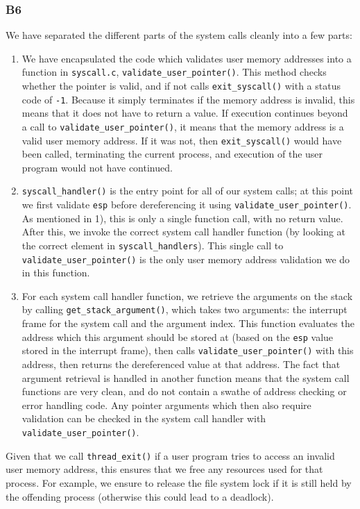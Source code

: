 \documentclass[a4wide, 11pt]{article}
\newcommand{\tx}{\texttt}
\begin{document}
\subsubsection{B6}

We have separated the different parts of the system calls cleanly into a few parts:

\begin{enumerate}
\item We have encapsulated the code which validates user memory addresses into a function in \tx{syscall.c}, \tx{validate\_user\_pointer()}. This method checks whether the pointer is valid, and if not calls \tx{exit\_syscall()} with a status code of \tx{-1}. Because it simply terminates if the memory address is invalid, this means that it does not have to return a value. If execution continues beyond a call to \tx{validate\_user\_pointer()}, it means that the memory address is a valid user memory address. If it was not, then \tx{exit\_syscall()} would have been called, terminating the current process, and execution of the user program would not have continued.
\item \tx{syscall\_handler()} is the entry point for all of our system calls; at this point we first validate \tx{esp} before dereferencing it using \tx{validate\_user\_pointer()}. As mentioned in 1), this is only a single function call, with no return value. After this, we invoke the correct system call handler function (by looking at the correct element in \tx{syscall\_handlers}). This single call to \tx{validate\_user\_pointer()} is the only user memory address validation we do in this function.
\item For each system call handler function, we retrieve the arguments on the stack by calling \tx{get\_stack\_argument()}, which takes two arguments: the interrupt frame for the system call and the argument index. This function evaluates the address which this argument should be stored at (based on the \tx{esp} value stored in the interrupt frame), then calls \tx{validate\_user\_pointer()} with this address, then returns the dereferenced value at that address. The fact that argument retrieval is handled in another function means that the system call functions are very clean, and do not contain a swathe of address checking or error handling code. Any pointer arguments which then also require validation can be checked in the system call handler with \tx{validate\_user\_pointer()}.
\end{enumerate}

Given that we call \tx{thread\_exit()} if a user program tries to access an invalid user memory address, this ensures that we free any resources used for that process. For example, we ensure to release the file system lock if it is still held by the offending process (otherwise this could lead to a deadlock).
\end{document}
